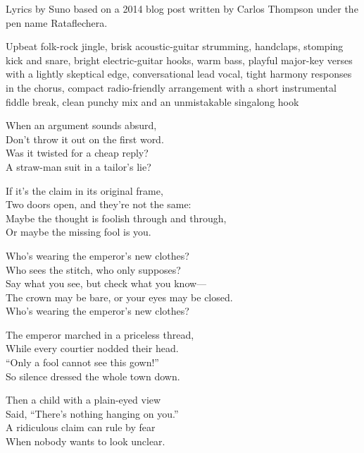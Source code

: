 
\begin{notes}
Lyrics by Suno based on a 2014 blog post written by Carlos Thompson under the pen name Rataflechera.
\end{notes}
\begin{style}
Upbeat folk-rock jingle, brisk acoustic-guitar strumming, handclaps, stomping kick and snare, bright electric-guitar hooks, warm bass, playful major-key verses with a lightly skeptical edge, conversational lead vocal, tight harmony responses in the chorus, compact radio-friendly arrangement with a short instrumental fiddle break, clean punchy mix and an unmistakable singalong hook
\end{style}
\begin{lyrics}
When an argument sounds absurd,\\
Don’t throw it out on the first word.\\
Was it twisted for a cheap reply?\\
A straw-man suit in a tailor’s lie?

If it’s the claim in its original frame,\\
Two doors open, and they’re not the same:\\
Maybe the thought is foolish through and through,\\
Or maybe the missing fool is you.

Who’s wearing the emperor’s new clothes?\\
Who sees the stitch, who only supposes?\\
Say what you see, but check what you know—\\
The crown may be bare, or your eyes may be closed.\\
Who’s wearing the emperor’s new clothes?

The emperor marched in a priceless thread,\\
While every courtier nodded their head.\\
“Only a fool cannot see this gown!”\\
So silence dressed the whole town down.

Then a child with a plain-eyed view\\
Said, “There’s nothing hanging on you.”\\
A ridiculous claim can rule by fear\\
When nobody wants to look unclear.


\end{lyrics}
